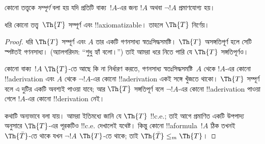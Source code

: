 \documentclass[../../../include/open-logic-section]{subfiles}
\begin{document}


কোনো তত্ত্বকে \emph{সম্পূর্ণ} বলা হয় যদি প্রতিটি বাক্য~$!A$-এর জন্য
$!A$ অথবা $\lnot !A$ প্রমাণযোগ্য হয়।

\begin{lem}
ধরি কোনো তত্ত্ব~$\Th{T}$ সম্পূর্ণ এবং !!{axiomatizable}। তাহলে
$\Th{T}$ নির্ণেয়।
\end{lem}

\begin{proof}
ধরি $\Th{T}$ সম্পূর্ণ এবং $A$ তার একটি গণনসাধ্য স্বতঃসিদ্ধসমষ্টি।
$\Th{T}$ অসঙ্গতিপূর্ণ হলে সেটি স্পষ্টতই গণনসাধ্য। (অ্যালগরিদম: ``শুধু
হ্যাঁ বলো।'') তাই আমরা ধরে নিতে পারি যে $\Th{T}$ সঙ্গতিপূর্ণও।

কোনো বাক্য~$!A$ $\Th{T}$-তে আছে কি না নির্ধারণ করতে, গণনসাধ্য
স্বতঃসিদ্ধসমষ্টি~$A$ থেকে $!A$-এর কোনো !!a{derivation} এবং $A$ থেকে
$\lnot !A$-এর কোনো !!a{derivation} একই সঙ্গে খুঁজতে থাকো। $\Th{T}$
সম্পূর্ণ বলে এ দুটির একটি অবশ্যই পাওয়া যাবে; আর $\Th{T}$ সঙ্গতিপূর্ণ
বলে $\lnot !A$-এর কোনো !!a{derivation} পাওয়া গেলে $!A$-এর কোনো
!!{derivation} নেই।

কথাটি অন্যভাবে বলা যায়। আমরা ইতিমধ্যে জানি যে $\Th{T}$ !!{c.e.}; তাই
আগে প্রমাণিত একটি উপপাদ্য অনুসারে $\Th{T}$-এর পূরকটিও !!{c.e.} দেখালেই
যথেষ্ট। কিন্তু কোনো !!a{formula}~$!A$ ঠিক তখনই $\Th{\bar T}$-তে থাকে
যখন $\lnot !A$ $\Th{T}$-তে থাকে; তাই $\Th{\bar T} \leq_m \Th{T}$।
\end{proof}
\end{document}
